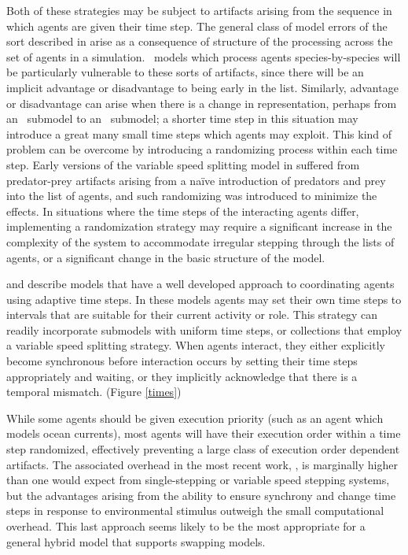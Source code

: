 Both of these strategies may be subject to artifacts arising from the
sequence in which agents are given their time step.  The general class
of model errors of the sort described in \cite{chivers2009generalised}
arise as a consequence of structure of the processing across the set
of agents in a simulation. \IB\ models which process agents
species-by-species will be particularly vulnerable to these sorts of
artifacts, since there will be an implicit advantage or disadvantage
to being early in the list.  Similarly, advantage or disadvantage can
arise when there is a change in rep\-re\-sen\-ta\-tion, perhaps from an
\SD\ sub\-model to an \IB\ sub\-model; a shorter time step in this
situation may introduce a great many small time steps which agents may
exploit.  This kind of problem can be overcome by introducing a
randomizing process within each time step. Early versions of the
variable speed splitting model in \cite{Lyne1994pmez5} suffered from
predator-prey artifacts arising from a na\"ive introduction of
predators and prey into the list of agents, and such randomizing was
introduced to minimize the effects. In situations where the time steps
of the interacting agents differ, implementing a randomization
strategy may require a significant increase in the complexity of the
system to accommodate irregular stepping through the lists of
agents, or a significant change in the basic structure of the model.

\cite{Gray2006nws} and \cite{Fulton2009crossingscales} describe models that have a well
developed approach to coordinating agents using adaptive time
steps. In these models agents may set their own time steps to
intervals that are suitable for their current activity or role. This
strategy can readily incorporate sub\-models with uniform time steps, or
collections that employ a variable speed splitting strategy. When
agents interact, they either explicitly become synchronous before
interaction occurs by setting their time steps appropriately and
waiting, or they implicitly acknowledge that there is a temporal
mismatch. (Figure \ref{times})

While some agents should be given execution priority (such as an agent
which models ocean currents), most agents will have their execution
order within a time step randomized, effectively preventing a large
class of execution order dependent artifacts.  The associated overhead
in the most recent work, \cite{Gray2006nws,Gray2012adaptive}, is marginally higher
than one would expect from single-stepping or variable speed stepping
systems, but the advantages arising from the ability to ensure
synchrony and change time steps in response to en\-vi\-ron\-men\-tal stimulus
outweigh the small computational overhead.  This last approach seems
likely to be the most appropriate for a general hybrid model that
supports swapping models.

